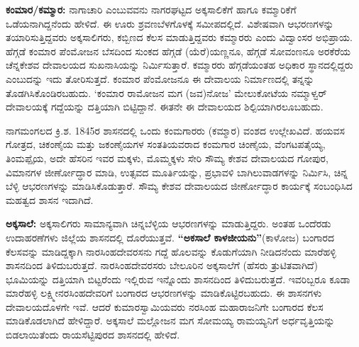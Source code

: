 \vskip 3pt

\textbf{ಕಂಮಾರ/ಕಮ್ಮಾರ:} ನಾಗಾಚಾರಿ ಎಂಬುವವನು ನಾಗರಘಟ್ಟದ ಅಕ್ಕಸಾಲಿಕೆಗೆ ಹಾಗೂ ಕಮ್ಮಾರಿಕೆಗೆ ಒಡೆಯನಾಗಿದ್ದ\-ನೆಂದು ಹೇಳಿದೆ. ಈ ಊರು ಶ್ರವಣಬೆಳಗೊಳಕ್ಕೆ ಸಮೀಪದಲ್ಲಿದೆ. ವಿಶೇಷವಾಗಿ ಆಭರಣಗಳನ್ನು ತಯಾರಿಸುತ್ತಿದ್ದವರು ಅಕ್ಕಸಾಲಿಗರು, ಕಬ್ಬಿಣದ ಕೆಲಸ ಮಾಡುತ್ತಿದ್ದವರು ಕಮ್ಮಾರರು ಎಂದು ವಿದ್ವಾಂಸರ ಅಭಿಪ್ರಾಯ. ಹೆಗ್ಗಡೆ ಕಂಮಾರ ಪೆಂಮೋಜನ ಬೆಸದಿಂದ ಸುಂಕದ ಹೆಗ್ಗಡೆ (ಯೆರೆ)ಯಣ್ಣನೂ, ಹೆಗ್ಗಡೆ ಸೋವಂಣನೂ ಅರಕೆರೆಯ ಚೆನ್ನಕೇಶವ ದೇವಾಲಯದ ಸುಖನಾಸಿಯನ್ನು ನಿರ್ಮಿಸುತ್ತಾರೆ. ಕಮ್ಮಾರರು ಹೆಗ್ಗಡೆಯಂತಹ ಅಧಿಕಾರ ಸ್ಥಾನದಲ್ಲಿದ್ದರು ಎಂಬುದನ್ನು ಇದು ತೋರಿಸುತ್ತದೆ. ಕಂಮಾರ ಪೆಂಮೋಜನೂ ಈ ದೇವಾಲಯ ನಿರ್ಮಾಣದಲ್ಲಿ ತನ್ನನ್ನು ತೊಡಗಿಸಿಕೊಂಡಿರಬಹುದು. ‘ಕಂಮಾರ ರಾಮೋಜನ ಮಗ (ಜವ)ನೋಜ’ ಮೇಲುಕೋಟೆಯ ನಮ್ಮಾಳ್ವರ್​ ದೇವಾಲಯಕ್ಕೆ ಗದ್ದೆಯನ್ನು ದತ್ತಿಯಾಗಿ ಬಿಟ್ಟಿದ್ದಾನೆ. ಈತನೇ ಈ ದೇವಾಲಯದ ಶಿಲ್ಪಿಯಾಗಿರಲೂ\-ಬಹುದು.

ನಾಗಮಂಗಲದ ಕ್ರಿ.ಶ. 1845ರ ಶಾಸನದಲ್ಲಿ ಒಂದು ಕಂಮಗಾರರು (ಕಮ್ಮಾರ) ವಂಶದ ಉಲ್ಲೇಖವಿದೆ. ಹಯವಸ ಗೋತ್ರದ, ಚಿಕಂಣೈಯ ಮತ್ತು ಜಕಂಣೈಯಗಳ ಸಂತತಿಯವರಾದ ಕಂಮಗಾರ ಚಿಂಣೈಯ, ವೆಂಗಟಪತೈಯ್ಯ, ತಿಂಮಪ್ಪೈಯ, ಅದೇ ಹೆಸರಿನ ಇವರ ಮಕ್ಕಳು, ಮೊಮ್ಮಕ್ಕಳು ಸೇರಿ ಸೌಮ್ಯ ಕೇಶವ ದೇವಾಲಯದ ಗೋಪುರ, ವಿಮಾನಗಳ ಜೀರ್ಣೋದ್ಧಾರ ಮಾಡಿ, ಉತ್ಸವದ ಮೂರ್ತಿಯನ್ನು, ಪ್ರಭಾವಳಿ ಬಾಗಿಲುವಾಡಗಳನ್ನು ನಿರ್ಮಿಸಿ, ಚಿನ್ನ ಬೆಳ್ಳಿ ಆಭರಣಗಳನ್ನು ಮಾಡಿಸಿಕೊಡುತ್ತಾರೆ. ಸೌಮ್ಯ ಕೇಶವ ದೇವಾಲಯದ ಜೀರ್ಣೋದ್ಧಾರ ಕಾರ್ಯಕ್ಕೆ ಸಂಬಂಧಿಸಿದ ಮಹತ್ವದ ಶಾಸನ ಇದಾಗಿದೆ.

\textbf{ಅಕ್ಕಸಾಲೆ:} ಅಕ್ಕಸಾಲಿಗರು ಸಾಮಾನ್ಯವಾಗಿ ಚಿನ್ನಬೆಳ್ಳಿಯ ಆಭರಣಗಳನ್ನು ಮಾಡುತ್ತಿದ್ದರು. ಅಂತಹ ಒಂದೆರಡು ಉದಾಹರಣೆಗಳು ಜಿಲ್ಲೆಯ ಶಾಸನದಲ್ಲಿ ದೊರೆಯುತ್ತವೆ. \textbf{“ಅಕಸಾಲೆ ಕಾಳಜೀಯನು”}(ಕಾಳೋಜ) ಬಂಗಾರದ ಕೆಲಸವನ್ನು ಮಾಡಿದ್ದಕ್ಕಾಗಿ ನಾರಸಿಂಹದೇವರಸನು ಗದ್ದೆ ಹೊಲವನ್ನು ಕೊಡುಗೆಯಾಗಿ ನೀಡಿದನೆಂದು ಮಾರೆಹಳ್ಳಿ ಶಾಸನದಿಂದ ತಿಳಿದು\-ಬರುತ್ತದೆ. ನಾರಸಿಂಹದೇವರಸರು ಬೇಲೂರಿನ ಅಕ್ಕಸಾಲೆಗೆ (ಹೆಸರು ತ್ರುಟಿತವಾಗಿದೆ) ಭೂಮಿಯನ್ನು ದತ್ತಿಯಾಗಿ ಬಿಟ್ಟರೆಂದು ಇಲ್ಲಿರುವ ಇನ್ನೊಂದು ಶಾಸನದಿಂದ ತಿಳಿದು\-ಬರುತ್ತದೆ. ಇವರಿಬ್ಬರೂ ಕೂಡಾ ಮಾರೆಹಳ್ಳಿ ಲಕ್ಷ್ಮೀನರಸಿಂಹದೇವರಿಗೆ ಬಂಗಾರದ ಆಭರಣಗಳನ್ನು ಮಾಡಿಕೊಟ್ಟಿರಬಹುದು. ಈ ಶಾಸನಗಳು ದೇವಾಲಯದೊಳಗೇ ಇವೆ. ಆದರೆ ಕುಮಾರಸ್ವಾಮಿ\-ಯವರು ನರಸಿಂಹ ಮಹಾರಾಜನಿಗೇ ಬಂಗಾರದ ಕೆಲಸ ಮಾಡಿಕೊಡಲಾಗಿದೆ ಹೇಳಿದ್ದಾರೆ. ಅಕ್ಕಸಾಲೆ ಮಲ್ಲೋಜನ ಮಗ ಸೋಮಯ್ಯ ರಾಮಯ್ಯನಿಗೆ ಅರ್ಧವೃತ್ತಿಯನ್ನು ಬಿಡಲಾಯಿತೆಂದು ರಾಯಸೆಟ್ಟಿಪುರದ ಶಾಸನದಲ್ಲಿ ಹೇಳಿದೆ.

